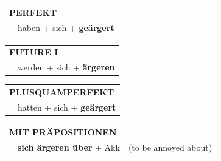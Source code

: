 \documentclass[10pt,a4paper]{revtex4-2}
\begin{document}
\begin{verbbox-acc}
 \begin{tabular}{rl}
     \multicolumn{2}{l}{\textbf{PERFEKT}}\\
    &haben + sich + \textbf{geärgert}\\
  \end{tabular}
\hfill
   \begin{tabular}{rl}
   
    \multicolumn{2}{l}{\textbf{FUTURE I} }\\
    &werden + sich + \textbf{ärgeren}\\
 
  \end{tabular}
\hfill
   \begin{tabular}{rl}
      \multicolumn{2}{l}{\textbf{PLUSQUAMPERFEKT}}\\
    &hatten + sich + \textbf{geärgert}\\
  \end{tabular}
  
\vspace{10pt}

   \begin{tabular}{lll}
      \multicolumn{3}{l}{\textbf{MIT PRÄPOSITIONEN}}\\
& \textbf{sich ärgeren über} + Akk & (to be annoyed about)
  \end{tabular}
  
  \vspace{-5pt}

\end{verbbox-acc}
\end{document}
